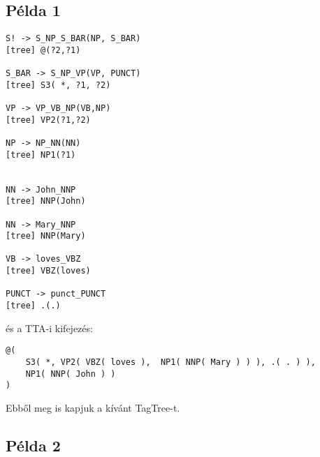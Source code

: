 \appendix
\chapter*{\fuggelek}
\setcounter{chapter}{\appendixnumber}



\section{Példa 1}
\label{sec:example1}

\begin{verbatim}
S! -> S_NP_S_BAR(NP, S_BAR)
[tree] @(?2,?1)

S_BAR -> S_NP_VP(VP, PUNCT)
[tree] S3( *, ?1, ?2)

VP -> VP_VB_NP(VB,NP)
[tree] VP2(?1,?2)

NP -> NP_NN(NN)
[tree] NP1(?1)


NN -> John_NNP
[tree] NNP(John)

NN -> Mary_NNP
[tree] NNP(Mary)

VB -> loves_VBZ
[tree] VBZ(loves)

PUNCT -> punct_PUNCT
[tree] .(.)
\end{verbatim}

és a TTA-i kifejezés: 
\begin{verbatim}
@(
	S3( *, VP2( VBZ( loves ),  NP1( NNP( Mary ) ) ), .( . ) ), 
	NP1( NNP( John ) ) 
)
\end{verbatim}

Ebből meg is kapjuk a kívánt TagTree-t.



\section{Példa 2}
\label{sec:example2}

